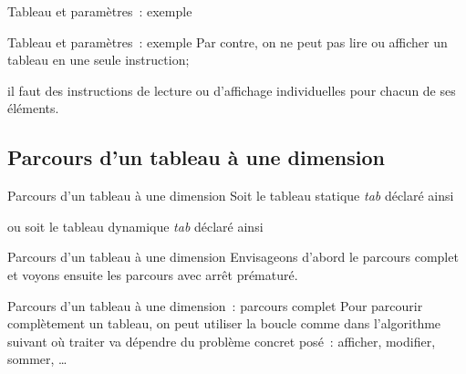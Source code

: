 \begin{frame}{Tableau et paramètres~: exemple}
\end{frame}

\begin{frame}{Tableau et paramètres~: exemple}
	Par contre, on ne peut pas lire ou afficher un tableau en une seule
	instruction; 
	
	il faut des instructions de lecture ou
	d'affichage individuelles pour chacun de ses éléments.
\end{frame}

\subsection{Parcours d'un tableau à une dimension}

\begin{frame}{Parcours d'un tableau à une dimension}
	Soit le tableau statique \textit{tab} déclaré ainsi

	\bigskip

	
	\bigskip

	ou soit le tableau dynamique \textit{tab} déclaré ainsi
	
	\bigskip

\end{frame}

\begin{frame}{Parcours d'un tableau à une dimension}
	Envisageons d'abord le parcours complet
	et voyons ensuite les parcours avec arrêt prématuré.
\end{frame}

\begin{frame}{Parcours d'un tableau à une dimension~: parcours complet}
	Pour parcourir complètement un tableau, 
	on peut utiliser la boucle 
	comme dans l'algorithme suivant
	où \og{}traiter\fg{} va dépendre du problème concret posé~:
	afficher, modifier, sommer, \dots
\end{frame}


